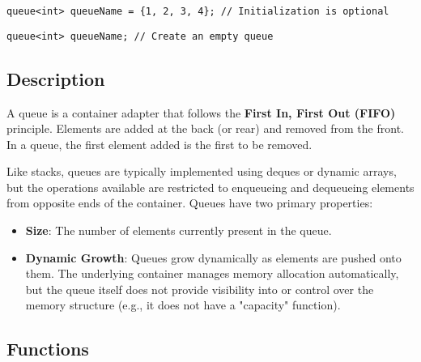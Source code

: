 \documentclass{article}
\begin{document}
\begin{lstlisting}
queue<int> queueName = {1, 2, 3, 4}; // Initialization is optional
\end{lstlisting}

\begin{lstlisting}
queue<int> queueName; // Create an empty queue
\end{lstlisting}

\subsection{Description}

A queue is a container adapter that follows the \textbf{First In, First Out (FIFO)} principle. Elements are added at the back (or rear) and removed from the front. In a queue, the first element added is the first to be removed.

\noindent Like stacks, queues are typically implemented using deques or dynamic arrays, but the operations available are restricted to enqueueing and dequeueing elements from opposite ends of the container.
\noindent Queues have two primary properties:
\begin{itemize}
    \item \textbf{Size}: The number of elements currently present in the queue.
    \item \textbf{Dynamic Growth}: Queues grow dynamically as elements are pushed onto them. The underlying container manages memory allocation automatically, but the queue itself does not provide visibility into or control over the memory structure (e.g., it does not have a "capacity" function).
\end{itemize}

\subsection{Functions}
\end{document}
